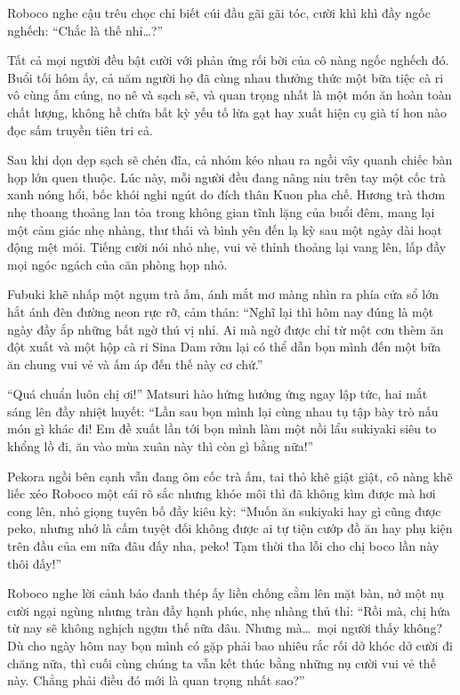 \documentclass[../main.tex]{subfiles}
\begin{document}
Roboco nghe cậu trêu chọc chỉ biết cúi đầu gãi gãi tóc, cười khì khì đầy ngốc nghếch: ``Chắc là thế nhỉ\dots?''

Tất cả mọi người đều bật cười với phản ứng rối bời của cô nàng ngốc nghếch đó. Buổi tối hôm ấy, cả năm người họ đã cùng nhau thưởng thức một bữa tiệc cà ri vô cùng ấm cúng, no nê và sạch sẽ, và quan trọng nhất là một món ăn hoàn toàn chất lượng, không hề chứa bất kỳ yếu tố lừa gạt hay xuất hiện cụ già tí hon nào đọc sấm truyền tiên tri cả.

\ct

Sau khi dọn dẹp sạch sẽ chén đĩa, cả nhóm kéo nhau ra ngồi vây quanh chiếc bàn họp lớn quen thuộc. Lúc này, mỗi người đều đang nâng niu trên tay một cốc trà xanh nóng hổi, bốc khói nghi ngút do đích thân Kuon pha chế. Hương trà thơm nhẹ thoang thoảng lan tỏa trong không gian tĩnh lặng của buổi đêm, mang lại một cảm giác nhẹ nhàng, thư thái và bình yên đến lạ kỳ sau một ngày dài hoạt động mệt mỏi. Tiếng cười nói nhỏ nhẹ, vui vẻ thỉnh thoảng lại vang lên, lấp đầy mọi ngóc ngách của căn phòng họp nhỏ.

Fubuki khẽ nhấp một ngụm trà ấm, ánh mắt mơ màng nhìn ra phía cửa sổ lớn hắt ánh đèn đường neon rực rỡ, cảm thán: ``Nghĩ lại thì hôm nay đúng là một ngày đầy ắp những bất ngờ thú vị nhỉ. Ai mà ngờ được chỉ từ một cơn thèm ăn đột xuất và một hộp cà ri Sina Dam rởm lại có thể dẫn bọn mình đến một bữa ăn chung vui vẻ và ấm áp đến thế này cơ chứ.''

``Quá chuẩn luôn chị ơi!'' Matsuri hào hứng hưởng ứng ngay lập tức, hai mắt sáng lên đầy nhiệt huyết: ``Lần sau bọn mình lại cùng nhau tụ tập bày trò nấu món gì khác đi! Em đề xuất lần tới bọn mình làm một nồi lẩu sukiyaki siêu to khổng lồ đi, ăn vào mùa xuân này thì còn gì bằng nữa!''

Pekora ngồi bên cạnh vẫn đang ôm cốc trà ấm, tai thỏ khẽ giật giật, cô nàng khẽ liếc xéo Roboco một cái rõ sắc nhưng khóe môi thì đã không kìm được mà hơi cong lên, nhỏ giọng tuyên bố đầy kiêu kỳ: ``Muốn ăn sukiyaki hay gì cũng được peko, nhưng nhớ là cấm tuyệt đối không được ai tự tiện cướp đồ ăn hay phụ kiện trên đầu của em nữa đâu đấy nha, peko! Tạm thời tha lỗi cho chị boco lần này thôi đấy!''

Roboco nghe lời cảnh báo đanh thép ấy liền chống cằm lên mặt bàn, nở một nụ cười ngại ngùng nhưng tràn đầy hạnh phúc, nhẹ nhàng thủ thỉ: ``Rồi mà, chị hứa từ nay sẽ không nghịch ngợm thế nữa đâu. Nhưng mà\dots\ mọi người thấy không? Dù cho ngày hôm nay bọn mình có gặp phải bao nhiêu rắc rối dở khóc dở cười đi chăng nữa, thì cuối cùng chúng ta vẫn kết thúc bằng những nụ cười vui vẻ thế này. Chẳng phải điều đó mới là quan trọng nhất sao?''
\end{document}
